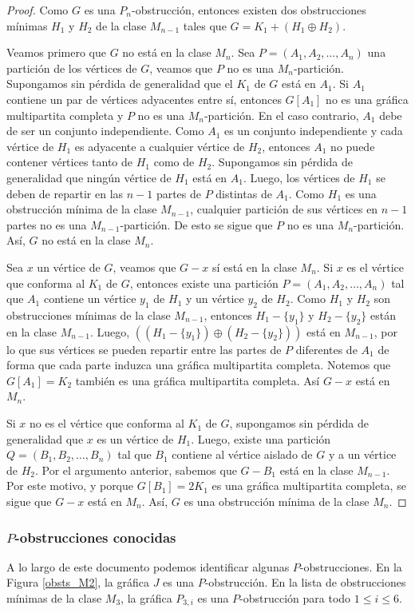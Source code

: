 \begin{proof}
Como $G$ es una $P_n$-obstrucción, entonces existen dos obstrucciones mínimas $H_1$ y $H_2$ de la clase $M_{n-1}$ tales que $G=K_1+(H_1\oplus H_2)$.

Veamos primero que $G$ no está en la clase $M_n$. Sea $P=(A_1, A_2, \dots, A_n)$ una partición de los vértices de $G$, veamos que $P$ no es una $M_n$-partición. Supongamos sin pérdida de generalidad que el $K_1$ de $G$ está en $A_1$. Si $A_1$ contiene un par de vértices adyacentes entre sí, entonces $G[A_1]$ no es una gráfica multipartita completa y $P$ no es una $M_n$-partición. En el caso contrario, $A_1$ debe de ser un conjunto independiente. Como $A_1$ es un conjunto independiente y cada vértice de $H_1$ es adyacente a cualquier vértice de $H_2$, entonces $A_1$ no puede contener vértices tanto de $H_1$ como de $H_2$. Supongamos sin pérdida de generalidad que ningún vértice de $H_1$ está en $A_1$. Luego, los vértices de $H_1$ se deben de repartir en las $n-1$ partes de $P$ distintas de $A_1$. Como $H_1$ es una obstrucción mínima de la clase $M_{n-1}$, cualquier partición de sus vértices en $n-1$ partes no es una $M_{n-1}$-partición. De esto se sigue que $P$ no es una $M_n$-partición. Así, $G$ no está en la clase $M_n$.

Sea $x$ un vértice de $G$, veamos que $G-x$ sí está en la clase $M_n$. Si $x$ es el vértice que conforma al $K_1$ de $G$, entonces existe una partición $P=(A_1, A_2, \dots, A_n)$ tal que $A_1$ contiene un vértice $y_1$ de $H_1$ y un vértice $y_2$ de $H_2$. Como $H_1$ y $H_2$ son obstrucciones mínimas de la clase $M_{n-1}$, entonces $H_1-\{y_1\}$ y $H_2-\{y_2\}$ están en la clase $M_{n-1}$. Luego, $((H_1-\{y_1\})\oplus(H_2-\{y_2\}))$ está en $M_{n-1}$, por lo que sus vértices se pueden repartir entre las partes de $P$ diferentes de $A_1$ de forma que cada parte induzca una gráfica multipartita completa. Notemos que $G[A_1]=K_2$ también es una gráfica multipartita completa. Así $G-x$ está en $M_n$. 

Si $x$ no es el vértice que conforma al $K_1$ de $G$, supongamos sin pérdida de generalidad que $x$ es un vértice de $H_1$. Luego, existe una partición $Q=(B_1, B_2, \dots, B_n)$ tal que $B_1$ contiene al vértice aislado de $G$ y a un vértice de $H_2$. Por el argumento anterior, sabemos que $G-B_1$ está en la clase $M_{n-1}$. Por este motivo, y porque $G[B_1]=2K_1$ es una gráfica multipartita completa, se sigue que $G-x$ está en $M_n$. Así, $G$ es una obstrucción mínima de la clase $M_n$.

\end{proof}

\subsubsection{$P$-obstrucciones conocidas}

A lo largo de este documento podemos identificar algunas $P$-obstrucciones. En la Figura \ref{obsts_M2}, la gráfica $J$ es una $P$-obstrucción. En la lista de obstrucciones mínimas de la clase $M_3$, la gráfica $P_{3,i}$ es una $P$-obstrucción para todo $1\le i \le 6$.